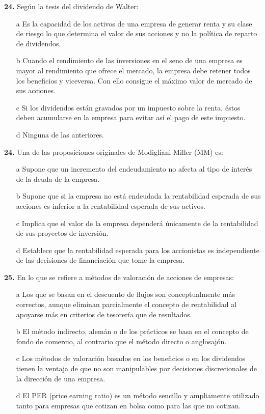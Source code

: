 \documentclass{nuevotema}
\begin{document}
\textbf{24.} Según la tesis del dividendo de Walter:

\begin{enumerate}
	\item[a] Es la capacidad de los activos de una empresa de generar renta y su clase de riesgo lo que determina el valor de sus acciones y no la política de reparto de dividendos.
	\item[b] Cuando el rendimiento de las inversiones en el seno de una empresa es mayor al rendimiento que ofrece el mercado, la empresa debe retener todos los beneficios y viceversa. Con ello consigue el máximo valor de mercado de sus acciones.
	\item[c] Si los dividendos están gravados por un impuesto sobre la renta, éstos deben acumularse en la empresa para evitar así el pago de este impuesto.
	\item[d] Ninguna de las anteriores.
\end{enumerate}

\textbf{24.} Una de las proposiciones originales de Modigliani-Miller (MM) es:

\begin{enumerate}
	\item[a] Supone que un incremento del endeudamiento no afecta al tipo de interés de la deuda de la empresa.
	\item[b] Supone que si la empresa no está endeudada la rentabilidad esperada de sus acciones es inferior a la rentabilidad esperada de sus activos.
	\item[c] Implica que el valor de la empresa dependerá únicamente de la rentabilidad de sus proyectos de inversión.
	\item[d] Establece que la rentabilidad esperada para los accionistas es independiente de las decisiones de financiación que tome la empresa.
\end{enumerate}

\textbf{25.} En lo que se refiere a métodos de valoración de acciones de empresas:

\begin{enumerate}
	\item[a] Los que se basan en el descuento de flujos son conceptualmente más correctos, aunque eliminan parcialmente el concepto de rentabilidad al apoyarse más en criterios de tesorería que de resultados.
	\item[b] El método indirecto, alemán o de los prácticos se basa en el concepto de fondo de comercio, al contrario que el método directo o anglosajón.
	\item[c] Los métodos de valoración basados en los beneficios o en los dividendos tienen la ventaja de que no son manipulables por decisiones discrecionales de la dirección de una empresa.
	\item[d] El PER (price earning ratio) es un método sencillo y ampliamente utilizado tanto para empresas que cotizan en bolsa como para las que no cotizan.
\end{enumerate}
\end{document}
